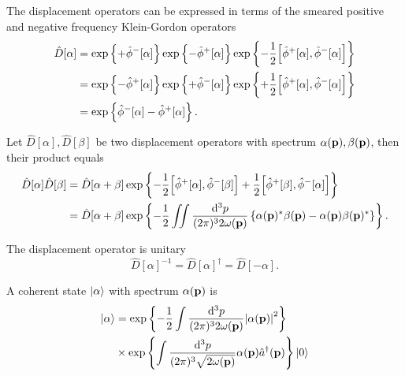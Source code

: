 \begin{lemma}\label{thm:displacement_operator_simplified}
	The displacement operators can be expressed in terms of the smeared positive and negative frequency Klein-Gordon operators
	\begin{equation}
		\begin{split}
			\hat{D}[\alpha]
			&=
			\exp\left\{
				+\hat\phi^-[\alpha]
			\right\}
			\exp\left\{
				-\hat\phi^+[\alpha]
			\right\}
			\exp\left\{
				-
				\frac{1}{2}
				\comm{\hat\phi^+[\alpha]}{\hat\phi^-[\alpha]}
			\right\}
			\\
			&=
			\exp\left\{
				-\hat\phi^+[\alpha]
			\right\}
			\exp\left\{
				+\hat\phi^-[\alpha]
			\right\}
			\exp\left\{
				+
				\frac{1}{2}
				\comm{\hat\phi^+[\alpha]}{\hat\phi^-[\alpha]}
			\right\}
			\\
			&=
			\exp\left\{
				\hat\phi^-[\alpha]
				-
				\hat\phi^+[\alpha]
			\right\}
			.
		\end{split}
	\end{equation}
\end{lemma}
\begin{lemma}\label{thm:displacement_operator_product}
	Let $\hat{D}[\alpha],\hat{D}[\beta]$ be two displacement operators with spectrum $\alpha(\vb{p}),\beta(\vb{p})$, then their product equals
	\begin{equation}
		\begin{split}
			\hat{D}[\alpha]
			\hat{D}[\beta]
			&=
			\hat{D}[\alpha+\beta]
			\exp\left\{
				-
				\frac{1}{2}
				\comm{\hat\phi^+[\alpha]}{\hat\phi^-[\beta]}
				+
				\frac{1}{2}
				\comm{\hat\phi^+[\beta]}{\hat\phi^-[\alpha]}
			\right\}
			\\
			&=
			\hat{D}[\alpha+\beta]
			\exp\left\{
				-
				\frac{1}{2}
				\iint\frac{\dd[3]{p}}{(2\pi)^32\omega(\vb{p})}
				\left\{
					\alpha(\vb{p})^*
					\beta(\vb{p})
					-
					\alpha(\vb{p})
					\beta(\vb{p})^*
				\right\}
			\right\}
			.
		\end{split}
	\end{equation}
\end{lemma}
\begin{lemma}\label{thm:displacement_operator_unitary}
	The displacement operator is unitary
	\begin{equation}
		\hat{D}[\alpha]^{-1}
		=
		\hat{D}[\alpha]^\dagger
		=
		\hat{D}[-\alpha]
		.
	\end{equation}
\end{lemma}
\begin{definition}
	A coherent state $\ket{\alpha}$ with spectrum $\alpha(\vb{p})$ is
	\begin{equation}
		\begin{split}
			\ket{\alpha}
			&=
			\exp\left\{
				-
				\frac{1}{2}
				\int\frac{\dd[3]{p}}{(2\pi)^32\omega(\vb{p})}
				\abs{\alpha(\vb{p})}^2
			\right\}
			\\
			&\times
			\exp\left\{
				\int\frac{\dd[3]{p}}{(2\pi)^3\sqrt{2\omega(\vb{p})}}
				\alpha(\vb{p})
				\hat{a}^\dagger(\vb{p})
			\right\}
			\ket{0}
		\end{split}
	\end{equation}
\end{definition}

